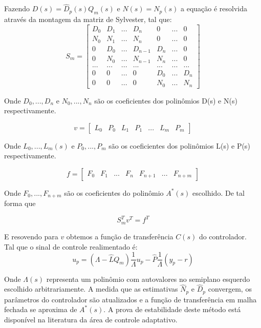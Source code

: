 \documentclass[conference,harvard,brazil,english]{sbatex}
\begin{document}
Fazendo $D(s) = \hat{D}_p(s) Q_m(s)$ e $N(s) = N_p(s)$ a equação é resolvida através da montagem da matriz de Sylvester, tal que:\\



\[ S_m = \begin{bmatrix}
D_0 & D_1 & ... & D_n     & 0   & ... & 0  \\
N_0 & N_1 & ... & N_n     & 0   & ... & 0  \\
0   & D_0 & ... & D_{n-1} & D_n & ... & 0  \\
0   & N_0 & ... & N_{n-1} & N_n & ... & 0  \\
... & ... & ... & ...     & ... & ... & ...\\
0   & 0   & ... & 0       & D_0 & ... & D_n\\
0   & 0   & ... & 0       & N_0 & ... & N_n
\end{bmatrix}
\]

Onde $D_0,...,D_n$ e $N_0,...,N_n$ são os coeficientes dos polinômios D(s) e N(s) respectivamente.

\[
 v = \begin{bmatrix}
     L_0 & P_0 & L_1 & P_1& ... & L_m & P_m
     \end{bmatrix}
\]

Onde $L_0,...,L_m(s)$ e $P_0,...,P_m$ são os coeficientes dos polinômios L(s) e P(s) respectivamente.

\[
 f = \begin{bmatrix}
     F_0 & F_1 & ... & F_n & F_{n+1} & ... & F_{n+m}
 \end{bmatrix}
\]

Onde $F_0,...,F_{n+m}$ são os coeficientes do polinômio $A^*(s)$ escolhido. De tal forma que

\begin{equation}
S_m^T v^T = f^T
\end{equation}

E resovendo para $v$ obtemos a função de transferência $C(s)$ do controlador.\\

Tal que o sinal de controle realimentado é:\\

\begin{equation}
u_p = (\Lambda - \hat{L} Q_m)\frac{1}{\Lambda} u_p - \hat{P} \frac{1}{\Lambda}(y_p - r)
\end{equation}

Onde $\Lambda(s)$ representa um polinômio com autovalores no semiplano esquerdo escolhido arbitrariamente. A medida que as estimativas $\hat{N}_p$ e $\hat{D}_p$ convergem, os parâmetros do controlador são atualizados e a função de transferência em malha fechada se aproxima de $A^*(s)$. A prova de estabilidade deste método está disponível na literatura da área de controle adaptativo. \cite{ioannou2}\cite{krstic}\cite{tao} \\
\end{document}
